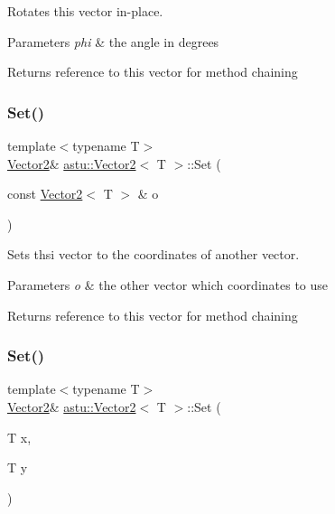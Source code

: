 Rotates this vector in-\/place.


\begin{DoxyParams}{Parameters}
{\em phi} & the angle in degrees \\
\hline
\end{DoxyParams}
\begin{DoxyReturn}{Returns}
reference to this vector for method chaining 
\end{DoxyReturn}
\mbox{\label{classastu_1_1Vector2_a303494be2ce5f334571f6f284ad13e28}} 
\subsubsection{\texorpdfstring{Set()}{Set()}\hspace{0.1cm}{\footnotesize\ttfamily [1/2]}}
{\footnotesize\ttfamily template$<$typename T$>$ \\
\hyperlink{classastu_1_1Vector2}{Vector2}\& \hyperlink{classastu_1_1Vector2}{astu\+::\+Vector2}$<$ T $>$\+::Set (\begin{DoxyParamCaption}\item[{const \hyperlink{classastu_1_1Vector2}{Vector2}$<$ T $>$ \&}]{o }\end{DoxyParamCaption})\hspace{0.3cm}{\ttfamily [inline]}}

Sets thsi vector to the coordinates of another vector.


\begin{DoxyParams}{Parameters}
{\em o} & the other vector which coordinates to use \\
\hline
\end{DoxyParams}
\begin{DoxyReturn}{Returns}
reference to this vector for method chaining 
\end{DoxyReturn}
\mbox{\label{classastu_1_1Vector2_a44e396e8e35cf3c4d1cc50de70b70220}} 
\subsubsection{\texorpdfstring{Set()}{Set()}\hspace{0.1cm}{\footnotesize\ttfamily [2/2]}}
{\footnotesize\ttfamily template$<$typename T$>$ \\
\hyperlink{classastu_1_1Vector2}{Vector2}\& \hyperlink{classastu_1_1Vector2}{astu\+::\+Vector2}$<$ T $>$\+::Set (\begin{DoxyParamCaption}\item[{T}]{x,  }\item[{T}]{y }\end{DoxyParamCaption})\hspace{0.3cm}{\ttfamily [inline]}}

